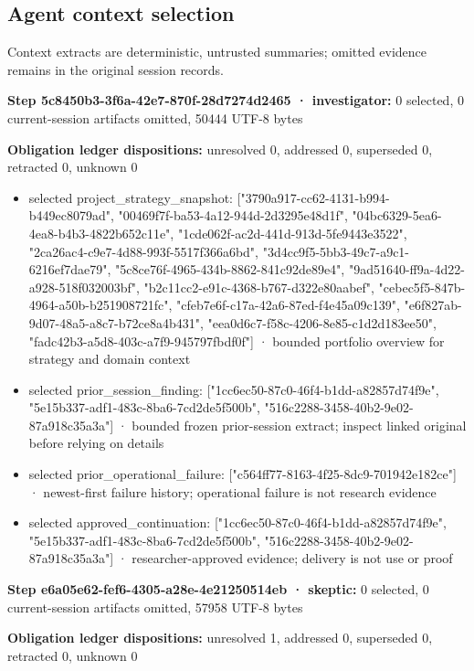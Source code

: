 \documentclass[11pt]{article}
\begin{document}
\subsection{Agent context selection}
Context extracts are deterministic, untrusted summaries; omitted evidence remains in the original session records.\par
\textbf{Step 5c8450b3-3f6a-42e7-870f-28d7274d2465 · investigator:} 0 selected, 0 current-session artifacts omitted, 50444 UTF-8 bytes\par
\textbf{Obligation ledger dispositions:} unresolved 0, addressed 0, superseded 0, retracted 0, unknown 0\par
\begin{itemize}
\item selected project\_strategy\_snapshot: ["3790a917-cc62-4131-b994-b449ec8079ad", "00469f7f-ba53-4a12-944d-2d3295e48d1f", "04bc6329-5ea6-4ea8-b4b3-4822b652c11e", "1cde062f-ac2d-441d-913d-5fe9443e3522", "2ca26ac4-c9e7-4d88-993f-5517f366a6bd", "3d4cc9f5-5bb3-49c7-a9c1-6216ef7dae79", "5c8ce76f-4965-434b-8862-841c92de89e4", "9ad51640-ff9a-4d22-a928-518f032003bf", "b2c11cc2-e91c-4368-b767-d322e80aabef", "cebec5f5-847b-4964-a50b-b251908721fc", "cfeb7e6f-c17a-42a6-87ed-f4e45a09c139", "e6f827ab-9d07-48a5-a8c7-b72ce8a4b431", "eea0d6c7-f58c-4206-8e85-c1d2d183ee50", "fadc42b3-a5d8-403c-a7f9-945797fbdf0f"] · bounded portfolio overview for strategy and domain context
\item selected prior\_session\_finding: ["1cc6ec50-87c0-46f4-b1dd-a82857d74f9e", "5e15b337-adf1-483c-8ba6-7cd2de5f500b", "516c2288-3458-40b2-9e02-87a918c35a3a"] · bounded frozen prior-session extract; inspect linked original before relying on details
\item selected prior\_operational\_failure: ["c564ff77-8163-4f25-8dc9-701942e182ce"] · newest-first failure history; operational failure is not research evidence
\item selected approved\_continuation: ["1cc6ec50-87c0-46f4-b1dd-a82857d74f9e", "5e15b337-adf1-483c-8ba6-7cd2de5f500b", "516c2288-3458-40b2-9e02-87a918c35a3a"] · researcher-approved evidence; delivery is not use or proof
\end{itemize}
\textbf{Step e6a05e62-fef6-4305-a28e-4e21250514eb · skeptic:} 0 selected, 0 current-session artifacts omitted, 57958 UTF-8 bytes\par
\textbf{Obligation ledger dispositions:} unresolved 1, addressed 0, superseded 0, retracted 0, unknown 0\par
\end{document}
